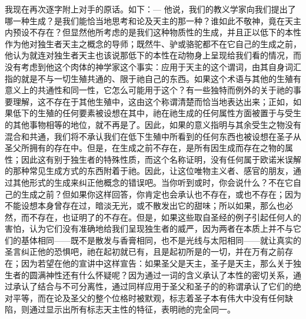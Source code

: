 我现在再次逐字附上对手的原话。如下：— 他说，我们的教义学家向我们提出了哪一种生成？是我们能恰当地思考和论及天主的那一种？谁如此不敬神，竟在天主内预设不存在？但显然他所考虑的是我们这种物质性的生成，并且正以低下的本性作为他对独生者天主之概念的导师；既然牛、驴或骆驼都不在它自己的生成之前，他认为就连对独生者天主也该说那低下的本性在动物身上呈现给我们看的情况，而没有考虑到他这个肉体的神学家这个事实：应用于天主的这个谓词，由其自身词汇指的就是不与一切生殖共通的、限于祂自己的东西。如果这个术语与其他的生殖有意义上的共通性和同一性，它怎么可能用于这个？有一些独特而例外的关于祂的事要理解，这不存在于其他生殖中，这由这个称谓清楚而恰当地表达出来；正如，如果低下的生殖的任何要素被设想在其中，祂在祂生成的任何属性方面被置于与受生的其他事物相等的地位，就不再是了。因此，如果的意义指明与其余受生之物没有混合和共通，我们将不承认我们在低下生殖中所看到的任何东西也被设想在圣子从圣父所拥有的存在中。但是，在生成之前不存在，是所有因生成而存在之物的属性；因此这有别于独生者的特殊性质，而这个名称证明，没有任何属于欧诺米误解的那种常见生成方式的东西附着于祂。因此，让这位唯物主义者、感官的朋友，通过其他形式的生成来纠正他概念的错误吧。当你听到或时，你会说什么？不在它自己的生成之前？但如果你这样回答，你肯定也会承认也不存在，或也不存在；因为不能设想本身曾存在过，暗淡无光，或不散发出它的甜味；所以如果，那么也必然，而不存在，也证明了的不存在。但是，如果这些取自圣经的例子引起任何人的害怕，认为它们没有准确地给我们呈现独生者的威严，因为两者在本质上并不与它们的基体相同——既不是散发与香膏相同，也不是光线与太阳相同——就让真实的圣言纠正他的恐惧吧，祂在起初就已有，且是起初所是的一切，并在万有之前存在；因为若望在他的宣讲中这样宣告：如果圣父是天主，圣子是天主，那么关于独生者的圆满神性还有什么怀疑呢？因为通过一词的含义承认了本性的密切关系，通过承认了结合与不可分离性，通过同样应用于圣父和圣子的的称谓承认了它们的绝对平等，而在论及圣父的整个位格时被默观，标志着圣子本有伟大中没有任何缺陷，则通过显示出所有标志天主性的特征，表明祂的完全同一。\par

